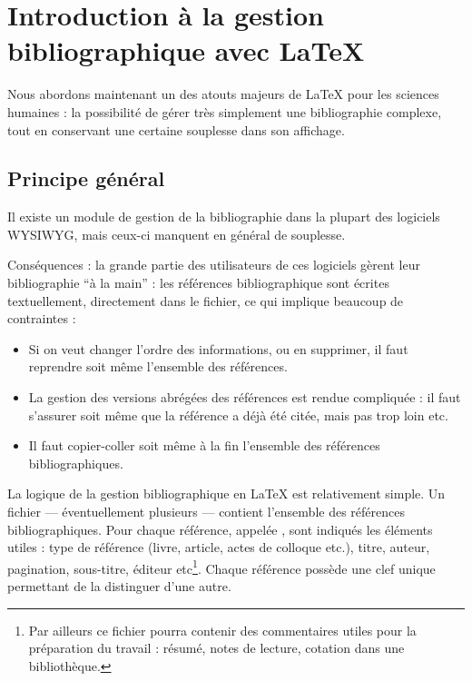 \chapter[Introduction]{Introduction à la gestion bibliographique avec \LaTeX{}}
\begin{prealable}
Nous abordons maintenant un des atouts majeurs de \LaTeX{} pour les sciences humaines : la possibilité de gérer très simplement une bibliographie complexe, tout en conservant une certaine souplesse dans son affichage.

\end{prealable}
\section{Principe général}



Il existe un module de gestion de la bibliographie dans la plupart des logiciels WYSIWYG, mais ceux-ci manquent en général de souplesse.

Conséquences : la grande partie des utilisateurs de ces logiciels gèrent leur bibliographie \enquote{à la main} : les références bibliographique sont écrites textuellement, directement dans le fichier, ce qui implique beaucoup de contraintes  :
\begin{itemize}
\item Si on veut changer l'ordre des informations, ou en supprimer, il faut reprendre soit même l'ensemble des références.
\item La gestion des versions abrégées des références est rendue compliquée :  il faut s'assurer soit même que la référence a déjà été citée, mais pas trop loin etc. 
\item Il faut copier-coller soit même à la fin l'ensemble des références bibliographiques. 
\end{itemize}

La logique de la gestion bibliographique en \LaTeX{} est relativement simple. Un fichier   --- éventuellement plusieurs --- contient l'ensemble des références bibliographiques. Pour chaque référence, appelée , sont indiqués les éléments utiles :  type de référence (livre, article, actes de colloque etc.), titre, auteur, pagination, sous-titre, éditeur etc\footnote{Par ailleurs ce fichier pourra contenir des commentaires utiles pour la préparation du travail : résumé, notes de lecture, cotation dans une bibliothèque.}. Chaque référence possède une clef unique permettant de la distinguer d'une autre.

